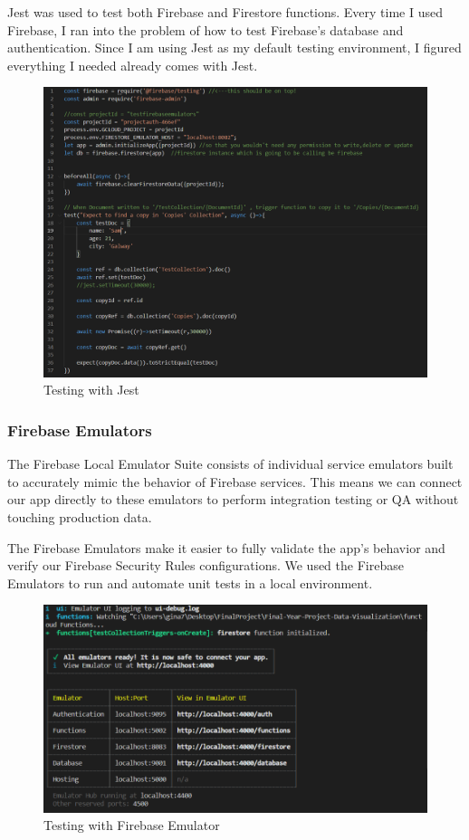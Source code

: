 Jest was used to test both Firebase and Firestore functions.
Every time I used Firebase, I ran into the problem of how to test Firebase's database and authentication. Since I am using Jest as my default testing environment, I figured everything I needed already comes with Jest.

\begin{figure}
    \centering
    \includegraphics[scale=0.5]{img/jest.PNG}
    \caption{Testing with Jest}
    \label{fig:my_label4}
\end{figure}

\subsubsection{Firebase Emulators}
The Firebase Local Emulator Suite consists of individual service emulators built to accurately mimic the behavior of Firebase services. This means we can connect our app directly to these emulators to perform integration testing or QA without touching production data.

The Firebase Emulators make it easier to fully validate the app's behavior and verify our Firebase Security Rules configurations.
We used the Firebase Emulators to run and automate unit tests in a local environment. 

\begin{figure}
    \centering
    \includegraphics[scale=0.6]{img/FirebaseEmulator.PNG}
    \caption{Testing with Firebase Emulator}
    \label{fig:my_label4}
\end{figure}

